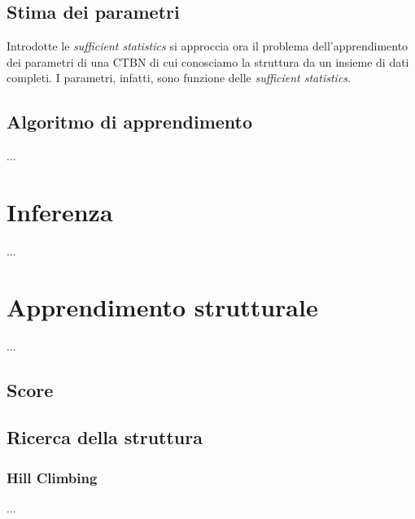 
\subsection{Stima dei parametri}
\label{sec:ctbn-params}
Introdotte le \emph{sufficient statistics} si approccia ora il problema dell'apprendimento dei parametri di una \acl{CTBN} di cui conosciamo la struttura da un insieme di dati completi.
I parametri, infatti, sono funzione delle \emph{sufficient statistics}.

\subsection{Algoritmo di apprendimento}
...

\section{Inferenza}
\label{sec:ctbn-inferenza}
...


\section{Apprendimento strutturale}
\label{sec:ctbn-apprendimento-strutturale}
...

\subsection{Score} %
\label{sec:ctbn-score}

\subsection{Ricerca della struttura}
\label{sec:ctbn-graph-search}

\subsubsection{Hill Climbing}
...

